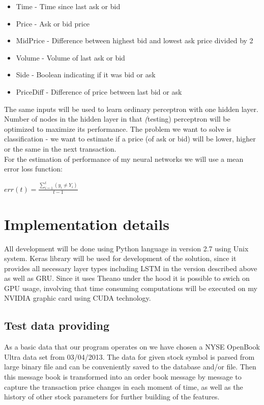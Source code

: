 \documentclass[twoside]{article}
\begin{document}
\begin{multicols}{2}
\begin{itemize}
\item Time - Time since last ask or bid
\item Price - Ask or bid price
\item MidPrice - Difference between highest bid and lowest ask price divided by 2
\item Volume - Volume of last ask or bid
\item Side - Boolean indicating if it was bid or ask
\item PriceDiff - Difference of price between last bid or ask
\end{itemize}

The same inputs will be used to learn ordinary perceptron with one hidden layer. 
Number of nodes in the hidden layer in that \emph(testing) perceptron will be optimized 
to maximize its performance. The problem we want to solve is classification - we want to estimate
if a price (of ask or bid) will be lower, higher or the same in the next transaction. \\
\newline
For the estimation of performance of my neural networks we will use a mean error loss function: \\
\newline
\begin{center}
$ err(t) = \frac{\sum\limits_{i=1}^t (y_{i} \neq Y_{i})}{t - 1} $
\end{center}

\section{Implementation details}

All development will be done using Python language in version 2.7 using Unix system.
Keras library will be used for development of the solution, since it provides all necessary 
layer types including LSTM in the version described above as well as GRU. Since it uses 
Theano under the hood it is possible to swich on GPU usage, involving that time consuming 
computations will be executed on my NVIDIA graphic card using CUDA technology.

\subsection{Test data providing}
As a basic data that our program operates on we have chosen a NYSE OpenBook Ultra data set from 03/04/2013. The data for given stock symbol is parsed from large binary file and can be conveniently saved to the database and/or file. Then this message book is transformed into an order book message by message to capture the transaction price changes in each moment of time, as well as the history of other stock parameters for further building of the features.


\end{multicols}
\end{document}

